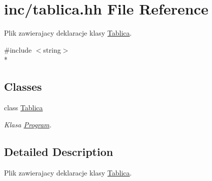 \hypertarget{tablica_8hh}{\section{inc/tablica.hh File Reference}
\label{tablica_8hh}
}


Plik zawierajacy deklaracje klasy \hyperlink{class_tablica}{Tablica}.  


{\ttfamily \#include $<$string$>$}\\*
\subsection*{Classes}
\begin{DoxyCompactItemize}
\item 
class \hyperlink{class_tablica}{Tablica}
\begin{DoxyCompactList}\small\item\em Klasa \hyperlink{class_program}{Program}. \end{DoxyCompactList}\end{DoxyCompactItemize}


\subsection{Detailed Description}
Plik zawierajacy deklaracje klasy \hyperlink{class_tablica}{Tablica}. 

